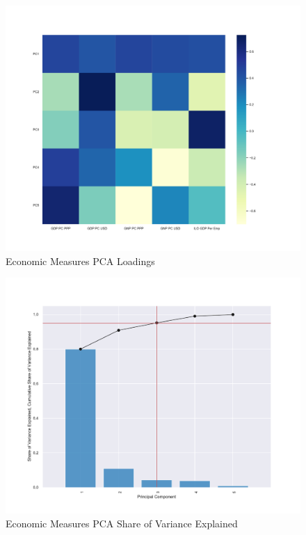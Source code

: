 \documentclass[10pt]{article}
\begin{document}
        \begin{figure}[h!]
            \centering
            \caption{Economic Measures PCA Loadings}
            \label{Econ_Loadings}	
            \includegraphics[width=\linewidth,keepaspectratio=true]{../Output/Figures/Econ_Indicator_Loadings_combined_short.pdf}
        \end{figure}

        \begin{figure}[h!]
            \centering
            \caption{Economic Measures PCA Share of Variance Explained}
            \label{Econ_Share_Explained}	
            \includegraphics[width=\linewidth,keepaspectratio=true]{../Output/Figures/Econ_Indicator_Share_Explained_combined_short.pdf}
        \end{figure}
\end{document}
